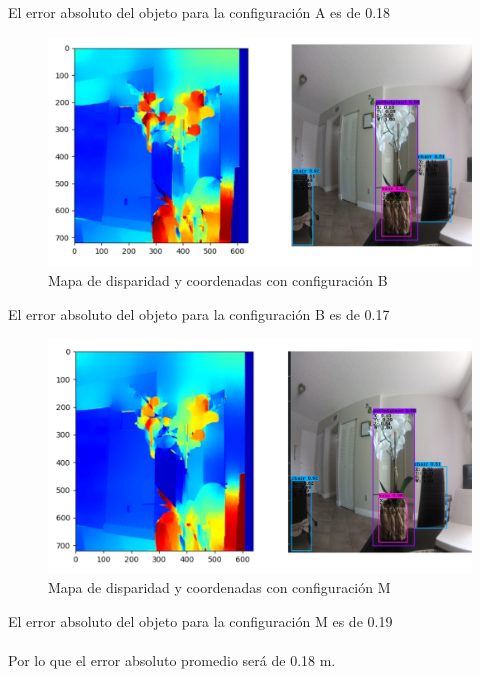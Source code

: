 El error absoluto del objeto para la configuración A es de 0.18
\begin{figure}[H]
    \centering
    \includegraphics[scale=0.5]{Recursos/position_configuration_B.jpg}
    \caption{Mapa de disparidad y coordenadas con configuración B}
    \label{pos_conf_B}
\end{figure}
El error absoluto del objeto para la configuración B es de 0.17
\begin{figure}[H]
    \centering
    \includegraphics[scale=0.5]{Recursos/position_configuration_M.jpg}
    \caption{Mapa de disparidad y coordenadas con configuración M}
    \label{pos_conf_M}
\end{figure}
El error absoluto del objeto para la configuración M es de 0.19
\\
\\ Por lo que el error absoluto promedio será de 0.18 m.
